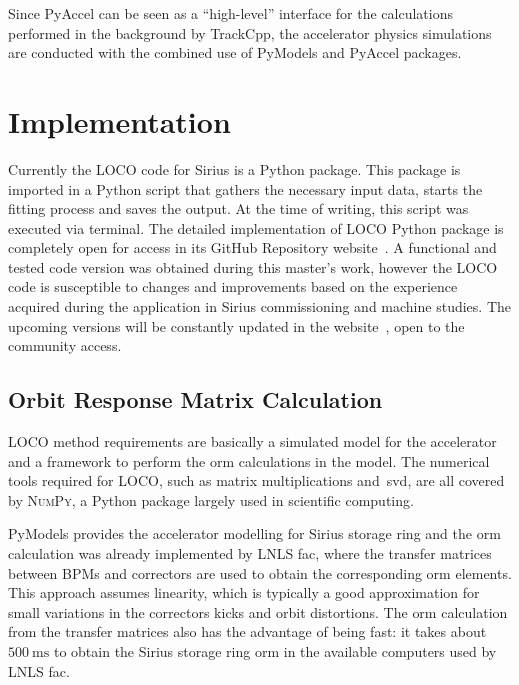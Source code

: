 Since PyAccel can be seen as a ``high-level'' interface for the calculations performed in the background by TrackCpp, the accelerator physics simulations are conducted with the combined use of PyModels and PyAccel packages.
\section{Implementation}
Currently the LOCO code for Sirius is a Python package. This package is imported in a Python script that gathers the necessary input data, starts the fitting process and saves the output. At the time of writing, this script was executed via terminal. The detailed implementation of LOCO Python package is completely open for access in its GitHub Repository website~\cite{locosirius}. A functional and tested code version was obtained during this master's work, however the LOCO code is susceptible to changes and improvements based on the experience acquired during the application in Sirius commissioning and machine studies. The upcoming versions will be constantly updated in the website~\cite{locosirius}, open to the community access.

\subsection{Orbit Response Matrix Calculation}
LOCO method requirements are basically a simulated model for the accelerator and a framework to perform the \gls{orm} calculations in the model. The numerical tools required for LOCO, such as matrix multiplications and~\gls{svd}, are all covered by \textsc{NumPy}, a Python package largely used in scientific computing. 

PyModels provides the accelerator modelling for Sirius storage ring and the \gls{orm} calculation was already implemented by LNLS \gls{fac}, where the transfer matrices between BPMs and correctors are used to obtain the corresponding \gls{orm} elements. This approach assumes linearity, which is typically a good approximation for small variations in the correctors kicks and orbit distortions. The \gls{orm} calculation from the transfer matrices also has the advantage of being fast: it takes about $\SI{500}{\milli\second}$ to obtain the Sirius storage ring \gls{orm} in the available computers used by LNLS \gls{fac}.

